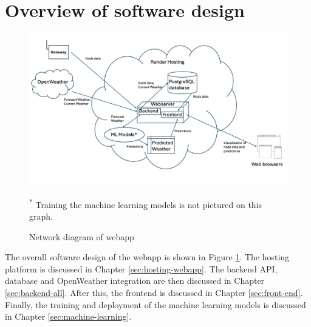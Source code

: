 \section{Overview of software design}\label{sec:software-overview}

\begin{figure}[H]
    \centering
    \includegraphics[width=1.1\textwidth]{contents/part-3/fig3/software-overview.png}
    \par\vspace{1pt} \noindent\begin{minipage}{0.95\textwidth}
    \centering\footnotesize\textsuperscript{*} Training the machine learning
    models is not pictured on this graph.
    \end{minipage}
    \par\vspace{1pt}
    \caption{Network diagram of webapp}
    \label{fig:software-schema}
\end{figure}

The overall software design of the webapp is shown in Figure
\ref{fig:software-schema}. The hosting platform is discussed in Chapter
\ref{sec:hosting-webapp}. The backend API, database and OpenWeather integration
are then discussed in Chapter \ref{sec:backend-all}. After this, the frontend is
discussed in Chapter \ref{sec:front-end}. Finally, the training and deployment of
the machine learning models is discussed in Chapter \ref{sec:machine-learning}.